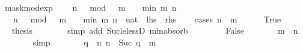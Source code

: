 \begin{isabellebody}
\isamarkupfalse%
%
\endisatagproof
{\isafoldproof}%
%
\isadelimproof
\isanewline
%
\endisadelimproof
\isanewline
{}\isamarkupfalse%
\ mask{\isacharunderscore}{\kern0pt}mod{\isacharunderscore}{\kern0pt}exp{\isacharcolon}{\kern0pt}\isanewline
\ \ {\isacartoucheopen}{\isacharparenleft}{\kern0pt}{}\ {\isacharcircum}{\kern0pt}\ n\ {\isacharminus}{\kern0pt}\ {}{\isacharparenright}{\kern0pt}\ mod\ {}\ {\isacharcircum}{\kern0pt}\ m\ {\isacharequal}{\kern0pt}\ {}\ {\isacharcircum}{\kern0pt}\ min\ m\ n\ {\isacharminus}{\kern0pt}\ {}{\isacartoucheclose}\isanewline
%
\isadelimproof
%
\endisadelimproof
%
\isatagproof
{}\isamarkupfalse%
\ {\isacharminus}{\kern0pt}\isanewline
\ \ \isamarkupfalse%
\ {\isacartoucheopen}{\isacharparenleft}{\kern0pt}{}\ {\isacharcircum}{\kern0pt}\ n\ {\isacharminus}{\kern0pt}\ {}{\isacharparenright}{\kern0pt}\ mod\ {}\ {\isacharcircum}{\kern0pt}\ m\ {\isacharequal}{\kern0pt}\ {}\ {\isacharcircum}{\kern0pt}\ min\ m\ n\ {\isacharminus}{\kern0pt}\ {\isacharparenleft}{\kern0pt}{}{\isacharcolon}{\kern0pt}{\isacharcolon}{\kern0pt}nat{\isacharparenright}{\kern0pt}{\isacartoucheclose}\ {\isacharparenleft}{\kern0pt}\ {\isacartoucheopen}{\isacharquery}{\kern0pt}lhs\ {\isacharequal}{\kern0pt}\ {\isacharquery}{\kern0pt}rhs{\isacartoucheclose}{\isacharparenright}{\kern0pt}\isanewline
\ \ \isamarkupfalse%
\ {\isacharparenleft}{\kern0pt}cases\ {\isacartoucheopen}n\ {\isasymle}\ m{\isacartoucheclose}{\isacharparenright}{\kern0pt}\isanewline
\ \ \ \ \isamarkupfalse%
\ True\isanewline
\ \ \ \ \isamarkupfalse%
\ \isamarkupfalse%
\ {\isacharquery}{\kern0pt}thesis\isanewline
\ \ \ \ \ \ \isamarkupfalse%
\ {\isacharparenleft}{\kern0pt}simp\ add{\isacharcolon}{\kern0pt}\ Suc{\isacharunderscore}{\kern0pt}le{\isacharunderscore}{\kern0pt}lessD\ min{\isachardot}{\kern0pt}absorb{}{\isacharparenright}{\kern0pt}\isanewline
\ \ \isamarkupfalse%
\isanewline
\ \ \ \ \isamarkupfalse%
\ False\isanewline
\ \ \ \ \isamarkupfalse%
\ \isamarkupfalse%
\ {\isacartoucheopen}m\ {\isacharless}{\kern0pt}\ n{\isacartoucheclose}\isanewline
\ \ \ \ \ \ \isamarkupfalse%
\ simp\isanewline
\ \ \ \ \isamarkupfalse%
\ \isamarkupfalse%
\ q\ \ n{\isacharcolon}{\kern0pt}\ {\isacartoucheopen}n\ {\isacharequal}{\kern0pt}\ Suc\ q\ {\isacharplus}{\kern0pt}\ m{\isacartoucheclose}\isanewline

\end{isabellebody}
